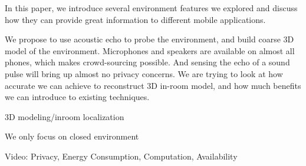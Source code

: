 In this paper, we introduce several environment features we explored and discuss how 
they can provide great information to different mobile applications. 






We propose to use acoustic echo to probe the environment, and build coarse 3D model 
of the environment. Microphones and speakers are available on almost all phones, 
which makes crowd-sourcing possible. And 
sensing the echo of a sound pulse will bring up almost no privacy concerns. We are 
trying to look at how accurate we can achieve to reconstruct 3D in-room model, and 
how much benefits we can introduce to existing techniques.


3D modeling/inroom localization

We only focus on closed environment

Video: Privacy, Energy Consumption, Computation, Availability

